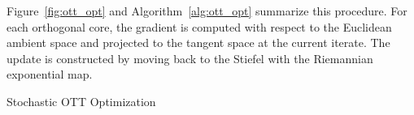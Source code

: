 Figure~\ref{fig:ott_opt} and Algorithm~\ref{alg:ott_opt} summarize this procedure. For each orthogonal core, the gradient is computed with respect to the Euclidean ambient space and projected to the tangent space at the current iterate. The update is constructed by moving back to the Stiefel with the Riemannian exponential map.
\begin{algorithm}
	\caption{Stochastic OTT Optimization}\label{alg:ott_opt}
	\SetAlgoLined
	\DontPrintSemicolon
\end{algorithm}

